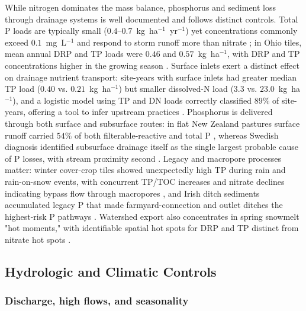 While nitrogen dominates the mass balance, phosphorus and sediment loss
through drainage systems is well documented and follows distinct
controls. Total P loads are typically small ($0.4$--$0.7$~kg~ha$^{-1}$~yr$^{-1}$)
yet concentrations commonly exceed $0.1$~mg~L$^{-1}$ and respond to storm
runoff more than nitrate \parencite{Tomer2008}; in Ohio tiles, mean annual
DRP and TP loads were $0.46$ and $0.57$~kg~ha$^{-1}$, with DRP and TP
concentrations higher in the growing season \parencite{King2016}. Surface
inlets exert a distinct effect on drainage nutrient transport: site-years
with surface inlets had greater median TP load ($0.40$ vs.
$0.21$~kg~ha$^{-1}$) but smaller dissolved-N load ($3.3$ vs.
$23.0$~kg~ha$^{-1}$), and a logistic model using TP and DN loads correctly
classified $89\%$ of site-years, offering a tool to infer upstream
practices \parencite{Flores2021}. Phosphorus is delivered through both
surface and subsurface routes: in flat New Zealand pastures surface runoff
carried $54\%$ of both filterable-reactive and total P
\parencite{Monaghan2016}, whereas Swedish diagnosis identified subsurface
drainage itself as the single largest probable cause of P losses, with
stream proximity second \parencite{Djodjic2002}. Legacy and macropore
processes matter: winter cover-crop tiles showed unexpectedly high TP
during rain and rain-on-snow events, with concurrent TP/TOC increases and
nitrate declines indicating bypass flow through macropores
\parencite{McNeill2026}, and Irish ditch sediments accumulated legacy P
that made farmyard-connection and outlet ditches the highest-risk P
pathways \parencite{Moloney2020,Opoku2024}. Watershed export
also concentrates in spring snowmelt "hot moments," with identifiable
spatial hot spots for DRP and TP distinct from nitrate hot spots
\parencite{Irvine2019}.

\subsection{Hydrologic and Climatic Controls}

\subsubsection{Discharge, high flows, and seasonality}

